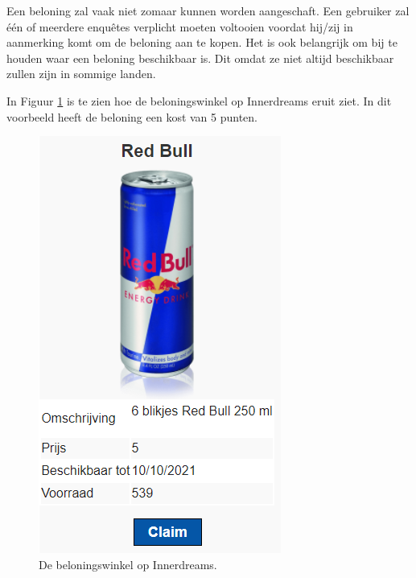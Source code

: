 Een beloning zal vaak niet zomaar kunnen worden aangeschaft. Een gebruiker zal één of meerdere enquêtes verplicht moeten voltooien voordat hij/zij in aanmerking komt om de beloning aan te kopen. Het is ook belangrijk om bij te houden waar een beloning beschikbaar is. Dit omdat ze niet altijd beschikbaar zullen zijn in sommige landen.

In Figuur \ref{fig:rewardshop} is te zien hoe de beloningswinkel op Innerdreams eruit ziet. In dit voorbeeld heeft de beloning een kost van 5 punten.

\begin{figure}
    \includegraphics[scale=0.95]{RewardShop.png}
    \centering
    \caption{De beloningswinkel op Innerdreams.}
    \label{fig:rewardshop}
\end{figure}